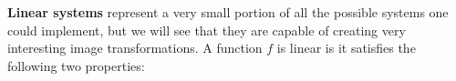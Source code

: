 %
%



{\bf Linear systems}
represent a very small portion of all the possible systems one could implement, but we will see that they are capable of creating very interesting image transformations. A function $f$ is linear is it satisfies the following two properties:

